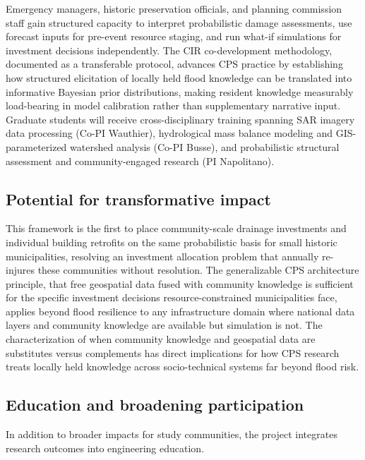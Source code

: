 \documentclass[11pt]{article}
\begin{document}
Emergency managers, historic preservation officials, and planning commission staff
gain structured capacity to interpret probabilistic damage assessments, use forecast
inputs for pre-event resource staging, and run what-if simulations for investment
decisions independently.
The CIR co-development methodology, documented as a transferable protocol, advances
CPS practice by establishing how structured elicitation of locally held flood
knowledge can be translated into informative Bayesian prior distributions, making
resident knowledge measurably load-bearing in model calibration rather than
supplementary narrative input.
Graduate students will receive cross-disciplinary training spanning
SAR imagery data processing (Co-PI Wauthier), hydrological mass balance modeling
and GIS-parameterized watershed analysis (Co-PI Busse), and probabilistic structural
assessment and community-engaged research (PI Napolitano).

\vspace{-10pt}
\subsection{Potential for transformative impact}
This framework is the first to place community-scale drainage investments and
individual building retrofits on the same probabilistic basis for small historic
municipalities, resolving an investment allocation problem that annually re-injures
these communities without resolution.
The generalizable CPS architecture principle, that free geospatial data fused with
community knowledge is sufficient for the specific investment decisions
resource-constrained municipalities face, applies beyond flood resilience to any
infrastructure domain where national data layers and community knowledge are available
but simulation is not.
The characterization of when community knowledge and geospatial data are substitutes
versus complements has direct implications for how CPS research treats locally held
knowledge across socio-technical systems far beyond flood risk.

\vspace{-10pt}
\subsection{Education and broadening participation}

In addition to broader impacts for study communities, the project integrates research
outcomes into engineering education.
\end{document}
